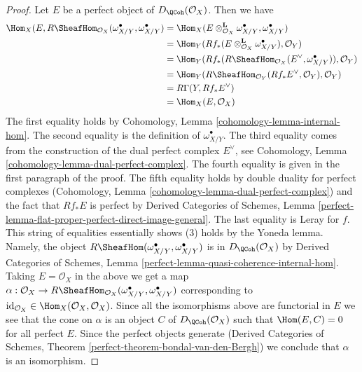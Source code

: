 \begin{proof}
\medskip\noindent
Let $E$ be a perfect object of $D_\QCoh(\mathcal{O}_X)$. Then
we have
\begin{align*}
\Hom_X(E, R\SheafHom_{\mathcal{O}_X}(\omega_{X/Y}^\bullet, \omega_{X/Y}^\bullet)
& =
\Hom_X(E \otimes_{\mathcal{O}_X}^\mathbf{L} \omega_{X/Y}^\bullet,
\omega_{X/Y}^\bullet) \\
& =
\Hom_Y(Rf_*(E \otimes_{\mathcal{O}_X}^\mathbf{L} \omega_{X/Y}^\bullet),
\mathcal{O}_Y) \\
& =
\Hom_Y(Rf_*(R\SheafHom_{\mathcal{O}_X}(E^\vee, \omega_{X/Y}^\bullet)),
\mathcal{O}_Y) \\
& =
\Hom_Y(R\SheafHom_{\mathcal{O}_Y}(Rf_*E^\vee, \mathcal{O}_Y),
\mathcal{O}_Y) \\
& =
R\Gamma(Y, Rf_*E^\vee) \\
& =
\Hom_X(E, \mathcal{O}_X)
\end{align*}
The first equality holds by Cohomology, Lemma
\ref{cohomology-lemma-internal-hom}.
The second equality is the definition of $\omega_{X/Y}^\bullet$.
The third equality comes from the construction of the dual perfect
complex $E^\vee$, see Cohomology, Lemma
\ref{cohomology-lemma-dual-perfect-complex}.
The fourth equality is given in the first paragraph of the proof.
The fifth equality holds by double duality for perfect complexes
(Cohomology, Lemma
\ref{cohomology-lemma-dual-perfect-complex})
and the fact that $Rf_*E$ is perfect by
Derived Categories of Schemes, Lemma
\ref{perfect-lemma-flat-proper-perfect-direct-image-general}.
The last equality is Leray for $f$.
This string of equalities essentially shows (3)
holds by the Yoneda lemma. Namely, the object
$R\SheafHom(\omega_{X/Y}^\bullet, \omega_{X/Y}^\bullet)$
is in $D_\QCoh(\mathcal{O}_X)$ by Derived Categories of Schemes, Lemma
\ref{perfect-lemma-quasi-coherence-internal-hom}.
Taking $E = \mathcal{O}_X$ in the above we get a map
$\alpha : \mathcal{O}_X \to
R\SheafHom_{\mathcal{O}_X}(\omega_{X/Y}^\bullet, \omega_{X/Y}^\bullet)$
corresponding to
$\text{id}_{\mathcal{O}_X} \in \Hom_X(\mathcal{O}_X, \mathcal{O}_X)$.
Since all the isomorphisms above are functorial in $E$ we
see that the cone on $\alpha$ is an object $C$ of $D_\QCoh(\mathcal{O}_X)$
such that $\Hom(E, C) = 0$ for all perfect $E$.
Since the perfect objects generate
(Derived Categories of Schemes, Theorem
\ref{perfect-theorem-bondal-van-den-Bergh})
we conclude that $\alpha$ is an isomorphism.
\end{proof}

